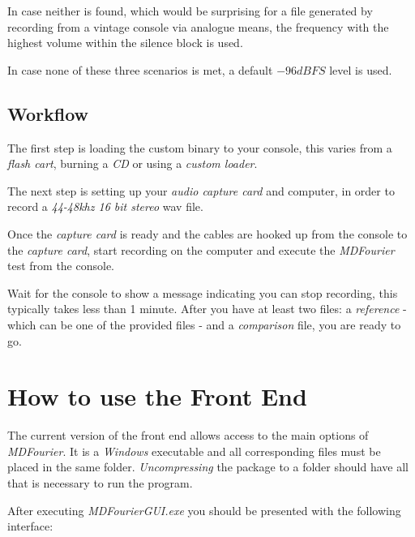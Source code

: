 \documentclass[10pt,a4paper]{report}
\begin{document}
In case neither is found, which would be surprising for a file generated by recording from a vintage console via analogue means, the frequency with the highest volume within the silence block is used. 

In case none of these three scenarios is met, a default $-96dBFS$ level is used.

\section{Workflow}

The first step is loading the custom binary to your console, this varies from a \textit{flash cart}, burning a \textit{CD} or using a \textit{custom loader}.

The next step is setting up your \textit{audio capture card} and computer, in order to record a \textit{44-48khz 16 bit stereo} wav file.

Once the \textit{capture card} is ready and the cables are hooked up from the console to the \textit{capture card}, start recording on the computer and execute the \textit{MDFourier} test from the console.

Wait for the console to show a message indicating you can stop recording, this typically takes less than 1 minute. After you have at least two files: a \textit{reference} - which can be one of the provided files -  and a \textit{comparison} file, you are ready to go. 

\chapter{How to use the Front End}
\label{usinggui}
The current version of the front end allows access to the main options of \textit{MDFourier}. It is a \textit{Windows} executable and all corresponding files must be placed in the same folder. \textit{Uncompressing} the package to a folder should have all that is necessary to run the program.

After executing \textit{MDFourierGUI.exe} you should be presented with the following interface:
\end{document}
